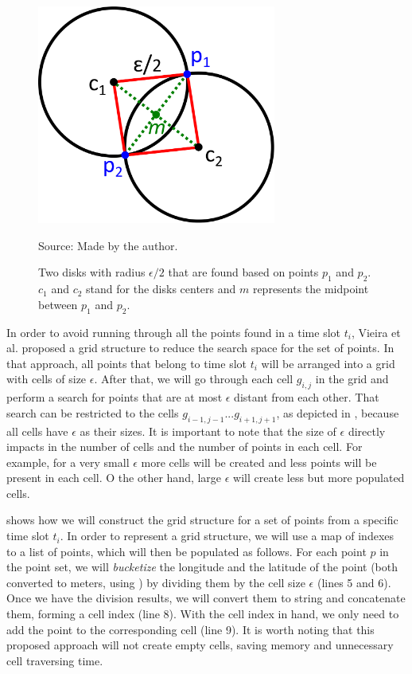 \begin{figure}[h!]
    \centering
    \caption{Two disks with radius $\epsilon/2$ that are found based on points $p_1$ and $p_2$. $c_1$ and $c_2$ stand
        for the disks centers and $m$ represents the midpoint between $p_1$ and $p_2$.}
    \centerline{\includegraphics[width=0.7\textwidth]{images/disks_discovery.eps}}
    \footnotesize{Source: Made by the author.}
    \label{fig:disks_discovery}
\end{figure}

In order to avoid running  through all the points found in a time slot $t_i$, Vieira et al.
\citep{vieira} proposed a grid structure to reduce the search space for the set of points. In that approach, all points
that belong to time slot $t_i$ will be arranged into a grid with cells of size $\epsilon$. After that, we will go
through each cell $g_{i,j}$ in the grid and perform a search for points that are at most $\epsilon$ distant from each
other. That search can be restricted to the cells $g_{i - 1, j - 1} ... g_{i + 1, j + 1}$, as depicted in
, because all cells have $\epsilon$ as their sizes. It is important to note that the size of $\epsilon$
directly impacts in the number of cells and the number of points in each cell. For example, for a very small $\epsilon$
more cells will be created and less points will be present in each cell.  O the other hand, large $\epsilon$ will create
less but more populated cells.

 shows how we will construct the grid structure for a set of points from a specific time slot $t_i$.
In order to represent a grid structure, we will use a map of indexes to a list of points, which will then be populated
as follows. For each point $p$ in the point set, we will \textit{bucketize} the longitude and the latitude of the point
(both converted to meters, using ) by dividing them by the cell size $\epsilon$ (lines 5 and 6).
Once we have the division results, we will convert them to string and concatenate them, forming a cell index (line 8).
With the cell index in hand, we only need to add the point to the corresponding cell (line 9). It is worth noting that
this proposed approach will not create empty cells, saving memory and unnecessary cell traversing time.

